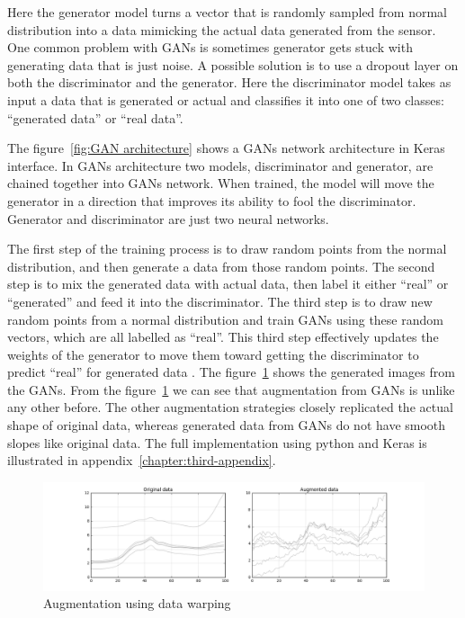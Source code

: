 Here the generator model turns a vector that is randomly sampled from normal distribution into a data mimicking the actual data generated from the sensor. One common problem with GANs is sometimes generator gets stuck with generating data that is just noise. A possible solution is to use a dropout layer on both the discriminator and the generator. Here the discriminator model takes as input a data that is generated or actual and classifies it into one of two classes: ``generated data''  or  ``real data''.

The figure~\ref{fig:GAN architecture} shows a GANs network architecture in Keras interface. In GANs architecture two models, discriminator and generator, are chained together into GANs network. When trained, the model will move the generator in a direction that improves its ability to fool the discriminator. Generator and discriminator are just two neural networks.

The first step of the training process is to draw random points from the normal distribution, and then generate a data from those random points. The second step is to mix the generated data with actual data, then label it either ``real'' or ``generated'' and feed it into the discriminator. The third step is to draw new random points from a normal distribution and train GANs using these random vectors, which are all labelled as ``real''. This third step effectively updates the weights of the generator to move them toward getting the discriminator to predict ``real'' for generated data \citep{chollet2017deep}. The figure~\ref{fig:GANs augmentation} shows the generated images from the GANs. From the figure~\ref{fig:GANs augmentation} we can see that augmentation from GANs is unlike any other before. The other augmentation strategies closely replicated the actual shape of original data, whereas generated data from GANs do not have smooth slopes like original data. The full implementation using python and Keras is illustrated in appendix~\ref{chapter:third-appendix}.


\begin{figure}[ht]
	\begin{center}
		\includegraphics[width=\textwidth]{images/gan_augment.png}
		\caption{Augmentation using data warping}
		\label{fig:GANs augmentation}
	\end{center}
\end{figure}

